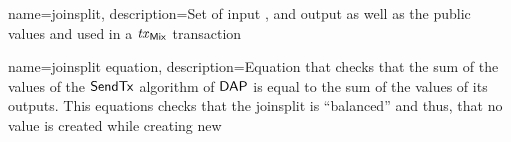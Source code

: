 


{
    name=joinsplit,
    description={Set of \jsin input \zethnotes, and \jsout output \zethnotes as well as the public values \vin and \vout used in a $\mathit{tx}_{\mathsf{Mix}}$ transaction}
}

{
    name=joinsplit equation,
    description={Equation that checks that the sum of the values of the $\mathsf{SendTx}$ algorithm of $\mathsf{DAP}$ is equal to the sum of the values of its outputs. This equations checks that the \gls{joinsplit} is ``balanced'' and thus, that no value is created while creating new \zethnotes}
}
